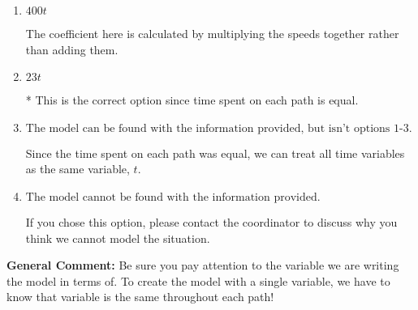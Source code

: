 \documentclass{extbook}[14pt]
\begin{document}
\begin{enumerate}
{\begin{enumerate}[label=\Alph*.]
The coefficient here is calculated as if you were trying to model the time on the total path.
\item \( 400 t \)

The coefficient here is calculated by multiplying the speeds together rather than adding them.
\item \( 23 t \)

* This is the correct option since time spent on each path is equal.
\item \( \text{The model can be found with the information provided, but isn't options 1-3.} \)

Since the time spent on each path was equal, we can treat all time variables as the same variable, $t$.
\item \( \text{The model cannot be found with the information provided.} \)

If you chose this option, please contact the coordinator to discuss why you think we cannot model the situation.
\end{enumerate}

\textbf{General Comment:} Be sure you pay attention to the variable we are writing the model in terms of. To create the model with a single variable, we have to know that variable is the same throughout each path!
}
\end{enumerate}
\end{document}
